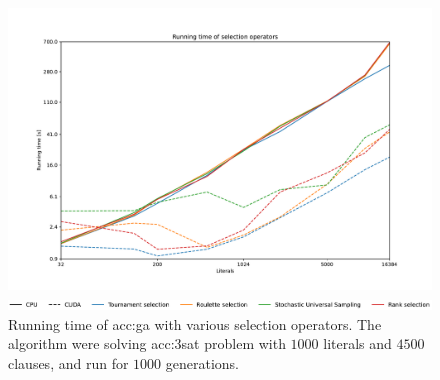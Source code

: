 
\begin{figure}[ht!]
    \centering
    \begin{minipage}[t]{0.9\textwidth}
        \includegraphics[width=\textwidth]{img/runs/time_ga_selections.pdf}
    \end{minipage}

    \begin{minipage}[t]{0.9\textwidth}
        \includegraphics[width=\textwidth]{img/runs/time_ga_selections_legend.pdf}
    \end{minipage}

    \caption[Running time of selection operators]{Running time of \acrlong{acc:ga} with various selection operators. The algorithm were solving \acrshort{acc:3sat} problem with $1000$ literals and $4500$ clauses, and run for $1000$ generations.}
\end{figure}





